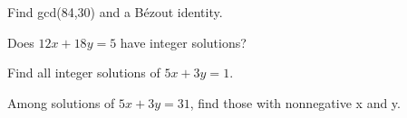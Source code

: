 \documentclass[11pt]{article}
\begin{document}
Find gcd(84,30) and a Bézout identity.\par
\vspace{5pt}
Does \(12x + 18y = 5\) have integer solutions?\par
\vspace{5pt}
Find all integer solutions of \(5x + 3y = 1\).\par
\vspace{5pt}
Among solutions of \(5x + 3y = 31\), find those with nonnegative x and y.\par
\vspace{5pt}
\end{document}
